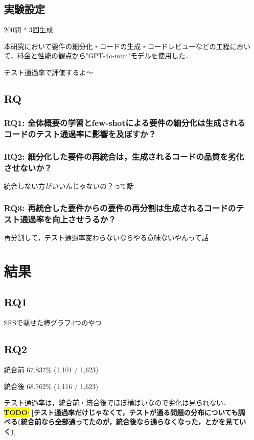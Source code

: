 \documentclass[submit,techrep,noauthor]{ipsj}
\newcommand{\todo}[1]{\colorbox{yellow}{{\bf TODO}:}{\color{red} {\textbf{[#1]}}}}
\begin{document}
\subsection{実験設定}
200問 * 3回生成

本研究において要件の細分化・コードの生成・コードレビューなどの工程において，料金と性能の観点から"GPT-4o-mini"モデルを使用した．

テスト通過率で評価するよ〜

\subsection{RQ}
\subsubsection{RQ1: 全体概要の学習とfew-shotによる要件の細分化は生成されるコードのテスト通過率に影響を及ぼすか？}
\subsubsection{RQ2: 細分化した要件の再統合は，生成されるコードの品質を劣化させないか？}
統合しない方がいいんじゃないの？って話
\subsubsection{RQ3: 再統合した要件からの要件の再分割は生成されるコードのテスト通過率を向上させうるか？}
再分割して，テスト通過率変わらないならやる意味ないやんって話

\section{結果}

\subsection{RQ1}
SESで載せた棒グラフ4つのやつ

\subsection{RQ2}
統合前
67.837\% (1,101 / 1,623)

統合後
68.762\% (1,116 / 1,623)

テスト通過率は，統合前・統合後でほぼ横ばいなので劣化は見られない．
\todo{テスト通過率だけじゃなくて，テストが通る問題の分布についても調べる(統合前なら全部通ってたのが，統合後なら通らなくなった，とかを見ていく)}
\end{document}
